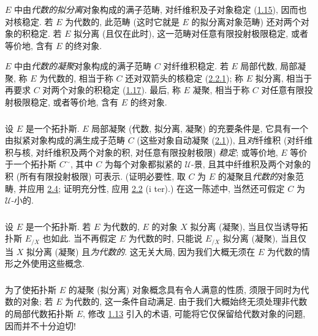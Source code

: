 \subsubsection{}
$E$ 中由\emph{代数的拟分离}对象构成的满子范畴,
对纤维积及子对象稳定 (\hyperref[VI.cor1.15]{1.15}),
因而也对核稳定.
若 $E$ 为代数的,
此范畴 (这时它就是\pageoriginale{} $E$ 的拟分离对象范畴)
还对两个对象的积稳定.
若 $E$ 拟分离 (且仅在此时),
这一范畴对任意有限投射极限稳定,
或者等价地, 含有 $E$ 的终对象.

$E$ 中由\emph{代数的凝聚}对象构成的满子范畴 $C$ 对纤维积稳定.
若 $E$ 局部代数, \ie 局部凝聚,
称 $E$ 为代数的, 相当于称 $C$ 还对双箭头的核稳定
(\hyperref[VI.rem2.2.1]{2.2.1});
称 $E$ 拟分离, 相当于再要求 $C$ 对两个对象的积稳定
(\cf \hyperref[VI.cor1.17]{1.17}).
最后, 称 $E$ 凝聚,
相当于称 $C$ 对任意有限投射极限稳定,
或者等价地, 含有 $E$ 的终对象.

\subsubsection{}
设 $E$ 是一个拓扑斯.
$E$ 局部凝聚 (\resp 代数, \resp 拟分离, \resp 凝聚)
的充要条件是, 它具有一个由拟紧对象构成的满生成子范畴 $C$
(这些对象自动凝聚 (\hyperref[VI.prop2.1]{2.1})),
且\emph{对}纤维积
(\resp 对纤维积与核,
\resp 对纤维积及两个对象的积,
\resp 对任意有限投射极限) \emph{稳定};
或等价地, $E$ 等价于一个拓扑斯 $C^{\sim}$,
其中 $C$ 为每个对象都拟紧的 $𝒰$-景,
且其中纤维积及两个对象的积
(\resp 所有有限投射极限) 可表示.
(证明必要性, 取\pageoriginale{} $C$ 为 $E$ 的凝聚且\emph{代数的}对象范畴,
并应用 \hyperref[VI.subsec2.4]{2.4};
证明充分性, 应用 \hyperref[VI.prop2.2]{2.2} (i ter).)
在这一陈述中, 当然还可假定 $C$ 为 $𝒰$-小的.

\subsubsection{}
设 $E$ 是一个拓扑斯.
若 $E$ 为代数的, $E$ 的对象 $X$ 拟分离 (\resp 凝聚),
当且仅当诱导拓扑斯 $E_{/X}$ 也如此.
当不再假定 $E$ 为代数的时,
只能说 $E_{/X}$ 拟分离 (\resp 凝聚),
当且仅当 $X$ 拟分离 (\resp 凝聚) 且\emph{为代数的}.
这无关大局, 因为我们大概无须在 $E$ 为代数的情形之外使用这些概念.

\subsubsection{}
为了使拓扑斯 $E$ 的凝聚 (\resp 拟分离) 对象概念具有令人满意的性质,
须限于同时为代数的对象;
若 $E$ 为代数的, 这一条件自动满足.
由于我们大概始终无须处理非代数的局部代数拓扑斯 $E$,
修改 \hyperref[VI.def1.13]{1.13} 引入的术语,
可能将它仅保留给代数对象的问题, 因而并不十分迫切!

